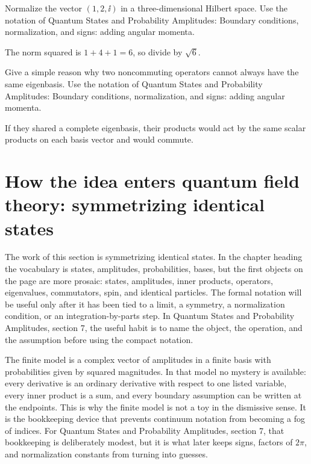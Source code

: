 \begin{exercise}
Normalize the vector \((1,2,\ii)\) in a three-dimensional Hilbert space.  Use the notation of Quantum States and Probability Amplitudes: Boundary conditions, normalization, and signs: adding angular momenta.
\begin{answer}
The norm squared is \(1+4+1=6\), so divide by \(\sqrt6\).
\end{answer}
\end{exercise}

\begin{exercise}
Give a simple reason why two noncommuting operators cannot always have the same eigenbasis.  Use the notation of Quantum States and Probability Amplitudes: Boundary conditions, normalization, and signs: adding angular momenta.
\begin{answer}
If they shared a complete eigenbasis, their products would act by the same scalar products on each basis vector and would commute.
\end{answer}
\end{exercise}



\section{How the idea enters quantum field theory: symmetrizing identical states}

The work of this section is symmetrizing identical states.  In the chapter heading the vocabulary is states, amplitudes, probabilities, bases, but the first objects on the page are more prosaic: states, amplitudes, inner products, operators, eigenvalues, commutators, spin, and identical particles.  The formal notation will be useful only after it has been tied to a limit, a symmetry, a normalization condition, or an integration-by-parts step.  In Quantum States and Probability Amplitudes, section 7, the useful habit is to name the object, the operation, and the assumption before using the compact notation.

The finite model is a complex vector of amplitudes in a finite basis with probabilities given by squared magnitudes.  In that model no mystery is available: every derivative is an ordinary derivative with respect to one listed variable, every inner product is a sum, and every boundary assumption can be written at the endpoints.  This is why the finite model is not a toy in the dismissive sense.  It is the bookkeeping device that prevents continuum notation from becoming a fog of indices.  For Quantum States and Probability Amplitudes, section 7, that bookkeeping is deliberately modest, but it is what later keeps signs, factors of \(2\pi\), and normalization constants from turning into guesses.

